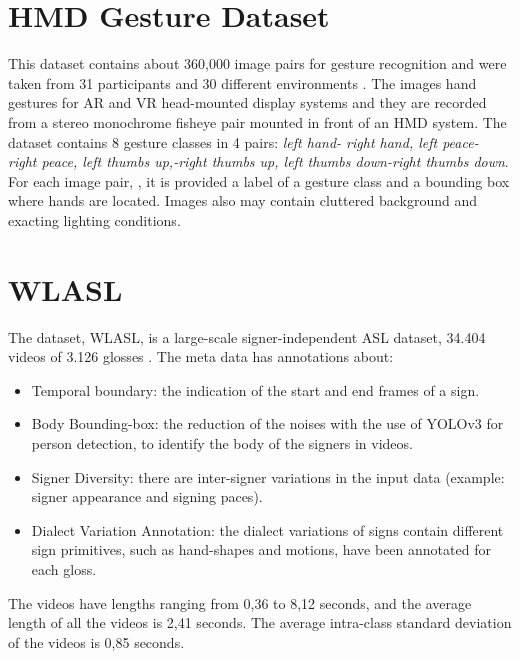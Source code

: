 \documentclass[12pt]{book}
\begin{document}
\section{HMD Gesture Dataset}
This dataset contains about 360,000 image pairs for gesture recognition and were taken from 31 participants and 30 different environments \cite{HMG}. The images hand gestures for AR and VR head-mounted display systems and they are recorded from a stereo monochrome fisheye pair mounted in front of an HMD system. The dataset contains 8 gesture classes in 4 pairs: \emph{left hand- right hand, left peace- right peace, left thumbs up,-right thumbs up, left thumbs down-right thumbs down}. For each image pair, , it is provided a label  of a gesture class and a bounding box where hands are located. Images also may contain cluttered background and exacting lighting conditions. 

\section{WLASL}
The dataset, WLASL, is a large-scale signer-independent ASL dataset, 34.404 videos of 3.126 glosses \cite{DON2020}. The meta data has annotations about: 

\begin{itemize}
    \item Temporal boundary: the indication of the start and end frames of a sign. 

    \item Body Bounding-box: the reduction of the noises with the use of YOLOv3 for person detection, to identify the body of the signers in videos. 
    
    \item Signer Diversity: there are inter-signer variations in the input data (example: signer appearance and signing paces). 
    
    \item Dialect Variation Annotation: the dialect variations of signs contain different sign primitives, such as hand-shapes and motions, have been annotated for each gloss. 
\end{itemize}

The videos have lengths ranging from 0,36 to 8,12 seconds, and the average length of all the videos is 2,41 seconds. The average intra-class standard deviation of the videos is 0,85 seconds.
\end{document}
